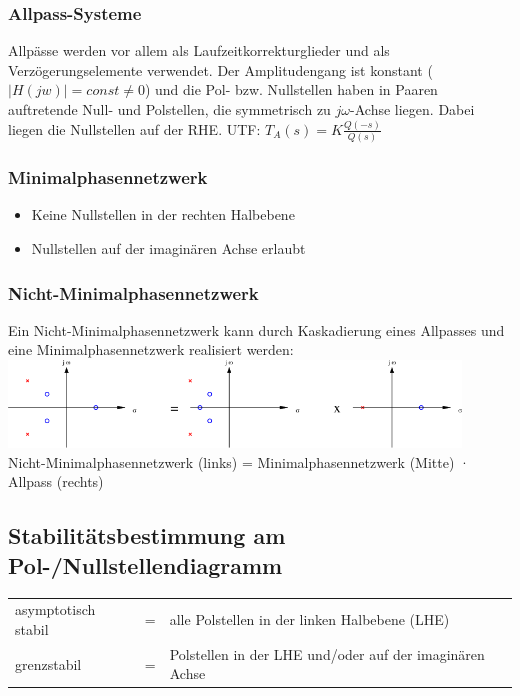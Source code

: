 \subsubsection{Allpass-Systeme}
Allpässe werden vor allem als Laufzeitkorrekturglieder und als
Verzögerungselemente verwendet. Der Amplitudengang ist konstant ($|H(jw)| =
const \neq 0$) und die Pol- bzw. Nullstellen haben in Paaren auftretende Null-
und Polstellen, die symmetrisch zu $j \omega$-Achse liegen. Dabei liegen die
Nullstellen auf der RHE.
UTF: $T_A(s) = K
\frac{Q(-s)}{Q(s)}$



\subsubsection{Minimalphasennetzwerk}
\begin{itemize}
  \item Keine Nullstellen in der rechten Halbebene
  \item Nullstellen auf der imaginären Achse erlaubt
\end{itemize}


\subsubsection{Nicht-Minimalphasennetzwerk}
Ein Nicht-Minimalphasennetzwerk kann durch Kaskadierung eines Allpasses und
eine Minimalphasennetzwerk realisiert werden:\\
\includegraphics[width=12cm]{./images/nicht-minimalphasennetzwerk.png}\\
Nicht-Minimalphasennetzwerk (links) = Minimalphasennetzwerk (Mitte) · Allpass (rechts)

\subsection{Stabilitätsbestimmung am Pol-/Nullstellendiagramm}
\begin{tabular}{lcl}
	asymptotisch stabil & = & alle Polstellen in der linken Halbebene (LHE) \\
	grenzstabil			& = & Polstellen in der LHE und/oder auf der imaginären Achse
\end{tabular}

